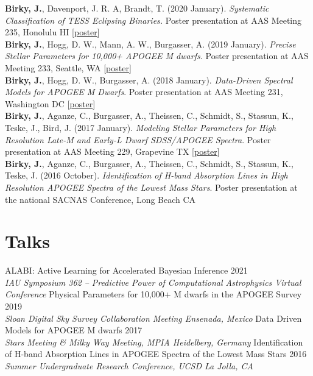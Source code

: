 \documentclass[margin,line]{resume}
\begin{document}
\begin{resume}
\textbf{Birky, J.}, Davenport, J. R. A, Brandt, T. (2020 January). \textsl{Systematic Classification of TESS Eclipsing Binaries.} Poster presentation at AAS Meeting 235, Honolulu HI [\href{https://doi.org/10.5281/zenodo.3605647}{poster}] \\
\newline
\textbf{Birky, J.}, Hogg, D. W., Mann, A. W., Burgasser, A. (2019 January). \textsl{Precise Stellar Parameters for 10,000+ APOGEE M dwarfs.} Poster presentation at AAS Meeting 233, Seattle, WA [\href{https://doi.org/10.5281/zenodo.2536586}{poster}] \\
\newline
\textbf{Birky, J.}, Hogg, D. W., Burgasser, A. (2018 January). \textit{Data-Driven Spectral Models for APOGEE M Dwarfs}. Poster presentation at AAS Meeting 231, Washington DC [\href{http://doi.org/10.5281/zenodo.1146909}{poster}] \\
\newline
\textbf{Birky, J.}, Aganze, C., Burgasser, A., Theissen, C., Schmidt, S., Stassun, K.,  Teske, J., Bird, J. (2017 January). \textsl{Modeling Stellar Parameters for High Resolution Late-M and Early-L Dwarf SDSS/APOGEE Spectra}. Poster presentation at AAS Meeting 229, Grapevine TX [\href{http://doi.org/10.5281/zenodo.1116625}{poster}]  \\
\newline
\textbf{Birky, J.}, Aganze, C., Burgasser, A., Theissen, C., Schmidt, S., Stassun, K.,  Teske, J. (2016 October). \textsl{Identification of H-band Absorption Lines in High Resolution APOGEE Spectra of the Lowest Mass Stars}. Poster presentation at the national SACNAS Conference, Long Beach CA 




\section{\mysidestyle \textcolor{bcolor}{Talks}}
ALABI: Active Learning for Accelerated Bayesian Inference \hfill 2021 \\
\textsl{IAU Symposium 362 -- Predictive Power of Computational Astrophysics \hfill Virtual Conference}\vspace{.2cm} \newline
Physical Parameters for 10,000+ M dwarfs in the APOGEE Survey \hfill 2019 \\ 
\textsl{Sloan Digital Sky Survey Collaboration Meeting \hfill Ensenada, Mexico}\vspace{.2cm} \newline
Data Driven Models for APOGEE M dwarfs \hfill 2017 \\ 
\textsl{Stars Meeting  \& Milky Way Meeting, MPIA \hfill Heidelberg, Germany}\vspace{.2cm} \newline
Identification of H-band Absorption Lines in APOGEE Spectra of the Lowest Mass Stars \hfill 2016 \\ 
\textsl{Summer Undergraduate Research Conference, UCSD \hfill La Jolla, CA}



\end{resume}
\end{document}
